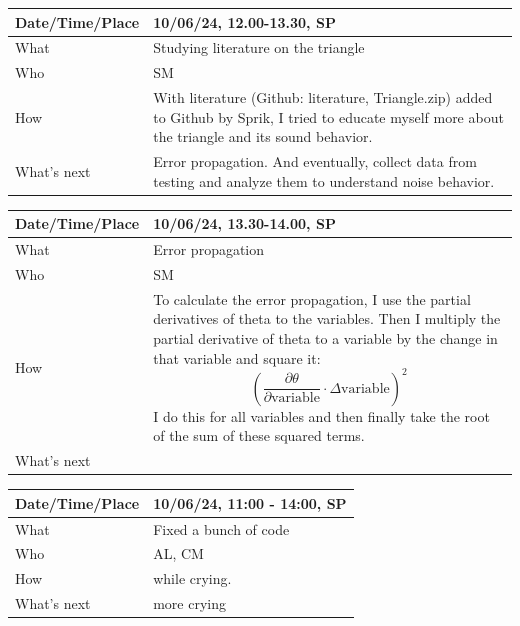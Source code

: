 \documentclass{article}
\begin{document}
\begin{table}[H]
\begin{tabular}{|p{1.5in}|p{4in}|}
\hline
Date/Time/Place &  10/06/24, 12.00-13.30, SP\\ \hline
What            &  Studying literature on the triangle \\ \hline
Who             &  SM\\ \hline
How             &  With literature (Github: literature, Triangle.zip) added to Github by Sprik, I tried to educate myself more about the triangle and its sound behavior.\\ \hline
What's next     &   Error propagation. And eventually, collect data from testing and analyze them to understand noise behavior.\\ \hline
\end{tabular}
\end{table}

\begin{table}[H]
\begin{tabular}{|p{1.5in}|p{4in}|}
\hline
Date/Time/Place &  10/06/24, 13.30-14.00, SP\\ \hline
What            &  Error propagation\\ \hline
Who             &  SM\\ \hline
How             &   To calculate the error propagation, I use the partial derivatives of theta to the variables. Then I multiply the partial derivative of theta to a variable by the change in that variable and square it: $$(\frac{\partial\theta}{\partial \text{variable}}\cdot\Delta\text{variable})^2$$ I do this for all variables and then finally take the root of the sum of these squared terms.\\ \hline
What's next     &  \\ \hline
\end{tabular}
\end{table}

\begin{table}[H]
\begin{tabular}{|p{1.5in}|p{4in}|}
\hline
Date/Time/Place &  10/06/24, 11:00 - 14:00, SP\\ \hline
What            &  Fixed a bunch of code\\ \hline
Who             &  AL, CM\\ \hline
How             &  while crying.\\ \hline
What's next     &  more crying\\ \hline
\end{tabular}
\end{table}
\end{document}
